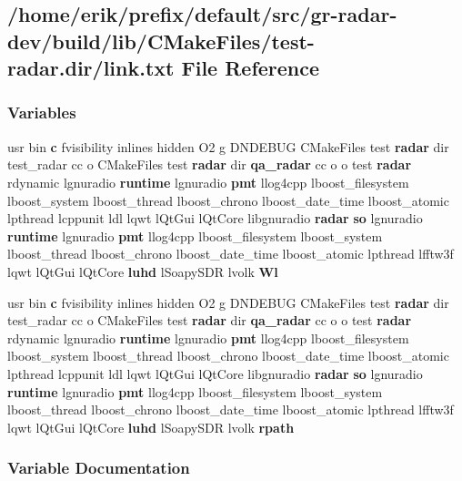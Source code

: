 \subsection{/home/erik/prefix/default/src/gr-\/radar-\/dev/build/lib/\+C\+Make\+Files/test-\/radar.dir/link.txt File Reference}
\label{gr-radar-dev_2build_2lib_2CMakeFiles_2test-radar_8dir_2link_8txt}
\subsubsection*{Variables}
\begin{DoxyCompactItemize}
\item 
usr bin {\bf c} fvisibility inlines hidden O2 g D\+N\+D\+E\+B\+UG C\+Make\+Files test {\bf radar} dir test\+\_\+radar cc o C\+Make\+Files test {\bf radar} dir {\bf qa\+\_\+radar} cc o o test {\bf radar} rdynamic lgnuradio {\bf runtime} lgnuradio {\bf pmt} llog4cpp lboost\+\_\+filesystem lboost\+\_\+system lboost\+\_\+thread lboost\+\_\+chrono lboost\+\_\+date\+\_\+time lboost\+\_\+atomic lpthread lcppunit ldl lqwt l\+Qt\+Gui l\+Qt\+Core libgnuradio {\bf radar} {\bf so} lgnuradio {\bf runtime} lgnuradio {\bf pmt} llog4cpp lboost\+\_\+filesystem lboost\+\_\+system lboost\+\_\+thread lboost\+\_\+chrono lboost\+\_\+date\+\_\+time lboost\+\_\+atomic lpthread lfftw3f lqwt l\+Qt\+Gui l\+Qt\+Core {\bf luhd} l\+Soapy\+S\+DR lvolk {\bf Wl}
\item 
usr bin {\bf c} fvisibility inlines hidden O2 g D\+N\+D\+E\+B\+UG C\+Make\+Files test {\bf radar} dir test\+\_\+radar cc o C\+Make\+Files test {\bf radar} dir {\bf qa\+\_\+radar} cc o o test {\bf radar} rdynamic lgnuradio {\bf runtime} lgnuradio {\bf pmt} llog4cpp lboost\+\_\+filesystem lboost\+\_\+system lboost\+\_\+thread lboost\+\_\+chrono lboost\+\_\+date\+\_\+time lboost\+\_\+atomic lpthread lcppunit ldl lqwt l\+Qt\+Gui l\+Qt\+Core libgnuradio {\bf radar} {\bf so} lgnuradio {\bf runtime} lgnuradio {\bf pmt} llog4cpp lboost\+\_\+filesystem lboost\+\_\+system lboost\+\_\+thread lboost\+\_\+chrono lboost\+\_\+date\+\_\+time lboost\+\_\+atomic lpthread lfftw3f lqwt l\+Qt\+Gui l\+Qt\+Core {\bf luhd} l\+Soapy\+S\+DR lvolk {\bf rpath}
\end{DoxyCompactItemize}


\subsubsection{Variable Documentation}

